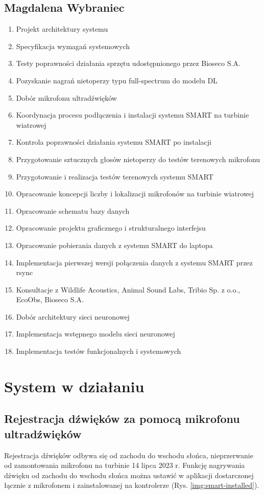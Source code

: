 \documentclass{sprz}
\begin{document}
\section{Magdalena Wybraniec}
\begin{enumerate}
  \item Projekt architektury systemu
  \item Specyfikacja wymagań systemowych
  \item Testy poprawności działania sprzętu udostępnionego przez Bioseco S.A.
  \item Pozyskanie nagrań nietoperzy typu full-spectrum do modelu DL
  \item Dobór mikrofonu ultradźwięków
  \item Koordynacja procesu podłączenia i instalacji systemu SMART na turbinie wiatrowej
  \item Kontrola poprawności działania systemu SMART po instalacji
  \item Przygotowanie sztucznych głosów nietoperzy do testów terenowych mikrofonu
  \item Przygotowanie i realizacja testów terenowych systemu SMART
  \item Opracowanie koncepcji liczby i lokalizacji mikrofonów na turbinie wiatrowej
  \item Opracowanie schematu bazy danych
  \item Opracowanie projektu graficznego i strukturalnego interfejsu
  \item Opracowanie pobierania danych z systemu SMART do laptopa
  \item Implementacja pierwszej wersji połączenia danych z systemu SMART przez rsync
  \item Konsultacje z Wildlife Acoustics, Animal Sound Labs, Tribio Sp. z o.o., EcoObs, Bioseco S.A.
  \item Dobór architektury sieci neuronowej
  \item Implementacja wstępnego modelu sieci neuronowej
  \item Implementacja testów funkcjonalnych i systemowych
\end{enumerate}

\chapter{System w działaniu}

\section{Rejestracja dźwięków za pomocą mikrofonu ultradźwięków}
Rejestracja dźwięków odbywa się od zachodu do wschodu słońca, nieprzerwanie od zamontowania mikrofonu na turbinie 14 lipca 2023 r. Funkcję nagrywania dźwięku od zachodu do wschodu słońca można ustawić w aplikacji dostarczonej łącznie z mikrofonem i zainstalowanej na kontrolerze (Rys. \ref{img:smart-installed}).
\end{document}
